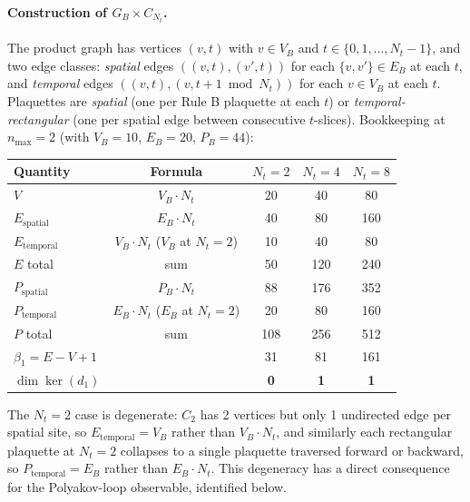 \documentclass[11pt]{article}
\begin{document}
\paragraph{Construction of $G_B\times C_{N_t}$.} The product graph has
vertices $(v,t)$ with $v\in V_B$ and $t\in\{0,1,\ldots,N_t-1\}$, and
two edge classes: \emph{spatial} edges $((v,t),(v',t))$ for each
$\{v,v'\}\in E_B$ at each $t$, and \emph{temporal} edges
$((v,t),(v,t+1\bmod N_t))$ for each $v\in V_B$ at each $t$. Plaquettes are
\emph{spatial} (one per Rule B plaquette at each $t$) or
\emph{temporal-rectangular} (one per spatial edge between consecutive
$t$-slices). Bookkeeping at $n_\text{max}=2$ (with $V_B=10$, $E_B=20$,
$P_B=44$):

\begin{center}
\begin{tabular}{lcccc}
\toprule
Quantity & Formula & $N_t=2$ & $N_t=4$ & $N_t=8$ \\
\midrule
$V$ & $V_B\cdot N_t$ & 20 & 40 & 80 \\
$E_\text{spatial}$ & $E_B\cdot N_t$ & 40 & 80 & 160 \\
$E_\text{temporal}$ & $V_B\cdot N_t$ ($V_B$ at $N_t=2$) & 10 & 40 & 80 \\
$E$ total & sum & 50 & 120 & 240 \\
$P_\text{spatial}$ & $P_B\cdot N_t$ & 88 & 176 & 352 \\
$P_\text{temporal}$ & $E_B\cdot N_t$ ($E_B$ at $N_t=2$) & 20 & 80 & 160 \\
$P$ total & sum & 108 & 256 & 512 \\
$\beta_1=E-V+1$ & & 31 & 81 & 161 \\
$\dim\ker(d_1)$ & & \textbf{0} & \textbf{1} & \textbf{1} \\
\bottomrule
\end{tabular}
\end{center}

The $N_t=2$ case is degenerate: $C_2$ has 2 vertices but only 1 undirected
edge per spatial site, so $E_\text{temporal}=V_B$ rather than $V_B\cdot N_t$,
and similarly each rectangular plaquette at $N_t=2$ collapses to a single
plaquette traversed forward or backward, so $P_\text{temporal}=E_B$ rather
than $E_B\cdot N_t$. This degeneracy has a direct consequence for the
Polyakov-loop observable, identified below.
\end{document}
